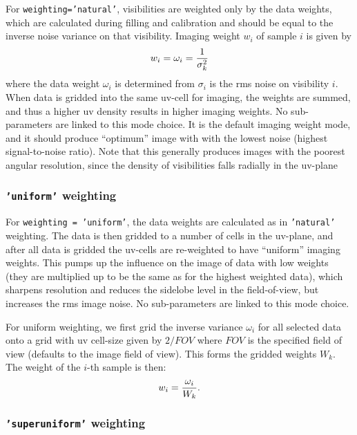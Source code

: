 For {\tt weighting='natural'}, visibilities are weighted only by the
data weights, which are calculated during filling and calibration and
should be equal to the inverse noise variance on that visibility.
Imaging weight $w_i$ of sample $i$ is given by
\begin{equation}
  w_i = \omega_i = {1 \over \sigma^2_k}
\end{equation}
where the data weight $\omega_i$ is determined from $\sigma_i$ is the
rms noise on visibility $i$.
When data is gridded into the same uv-cell for imaging, the weights
are summed, and thus a higher uv density results in higher imaging
weights.  No sub-parameters are linked to this mode choice.  It is the
default imaging weight mode, and it should produce ``optimum'' image
with with the lowest noise (highest signal-to-noise ratio).  Note that
this generally produces images with the poorest angular resolution,
since the density of visibilities falls radially in the uv-plane

\subsubsection{{\tt 'uniform'} weighting }
\label{section:im.pars.weighting.uniform}

For {\tt weighting = 'uniform'}, the data weights are calculated
as in {\tt 'natural'} weighting.  The data is then gridded to
a number of cells in the uv-plane, and after all data is gridded
the uv-cells are re-weighted to have ``uniform'' imaging weights.
This pumps
up the influence on the image of data with low weights (they are
multiplied up to be the same as for the highest weighted data), which
sharpens resolution and reduces the sidelobe level in the
field-of-view, but increases the rms image noise. No sub-parameters are
linked to this mode choice.

For uniform weighting, we first grid the inverse variance $\omega_i$
for all selected data onto a grid with uv cell-size given by $2/FOV$
where $FOV$ is the specified field of view (defaults to the image
field of view).  This forms the gridded weights $W_k$. The weight of
the $i$-th sample is then: 
\begin{equation}
  w_i = {\omega_i \over W_k}.
\end{equation}

\subsubsection{{\tt 'superuniform'} weighting }
\label{section:im.pars.weighting.superuniform}

